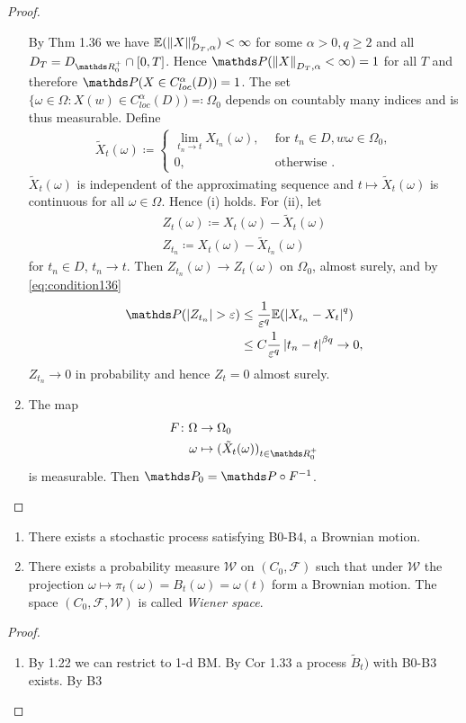 \begin{proof}
\begin{enumerate}[label=\alph*)]
By Thm 1.36 we have $\E{\norm{X}_{D_T,\alpha}^q}<\infty$ for some $\alpha>0,q\geq 2$ and all $D_T=D_{\R_0^+}\cap [0,T]$.
Hence $\Prob(\norm{X}_{D_T,\alpha}<\infty)=1$ for all $T$ and therefore $\Prob(X\in C_{loc}^\alpha (D))=1$.
The set $\{\omega \in \Omega \colon X(w) \in C_{loc}^\alpha(D))\eqqcolon \Omega_0$ depends on countably many indices and is thus measurable.
Define
\begin{align*}
\tilde{X}_t(\omega)\coloneqq \begin{cases}
\lim_{t_n \to t} X_{t_n}(\omega),~~&\text{for } t_n \in D, w \omega \in \Omega_0,\\
0, &\text{otherwise }.
\end{cases}
\end{align*}
$\tilde{X}_t(\omega)$ is independent of the approximating sequence and $t \mapsto \tilde{X}_t(\omega)$ is continuous for all $\omega \in \Omega$.
Hence (i) holds. For (ii), let
\begin{align*}
Z_t(\omega)\coloneqq X_t(\omega) -\tilde{X}_t(\omega)\\
Z_{t_n} \coloneqq X_t(\omega)-\tilde{X}_{t_n}(\omega)
\end{align*}
for $t_n \in D$, $t_n \to t$.
Then $Z_{t_n}(\omega)\to Z_t(\omega)$ on $\Omega_0$, \ie almost surely, and by \eqref{eq:condition136}
\begin{align*}
\Prob(\abs{Z_{t_n}}>\varepsilon)&\leq \frac{1}{\varepsilon^q}\E{\abs{X_{t_n}-X_t}^q}\\
&\leq C \frac{1}{\varepsilon^q}\abs{t_n-t}^{\beta q} \to 0,
\end{align*}
$Z_{t_n}\to 0$ in probability and hence $Z_t=0$ almost surely.
\item The map 
\begin{align*}
F \colon \Omega &\to \Omega_0\\
\omega &\mapsto (\tilde{X}_t(\omega))_{t\in \R_0^+}
\end{align*}
is measurable.
Then $\Prob_0=\Prob \circ F^{-1}$. \qedhere
\end{enumerate}
\end{proof}

\begin{thm}
\begin{enumerate}[label=\alph*)]
\item There exists a stochastic process satisfying B0-B4, \ie a Brownian motion.
\item There exists a probability measure $\mathcal{W}$ on $(C_0,\mathcal{F})$ such that under $\mathcal{W}$ the projection $\omega \mapsto \pi_t(\omega)=B_t(\omega)=\omega(t)$ form a Brownian motion.
The space $(C_0,\mathcal{F},\mathcal{W})$ is called \emph{Wiener space}.
\end{enumerate}
\end{thm}

\begin{proof}
\begin{enumerate}[label=(\roman*)]
\item By 1.22 we can restrict to 1-d BM.
By Cor 1.33 a process $\tilde{B}_t)$ with B0-B3 exists. By B3
\end{enumerate}
\end{proof}
